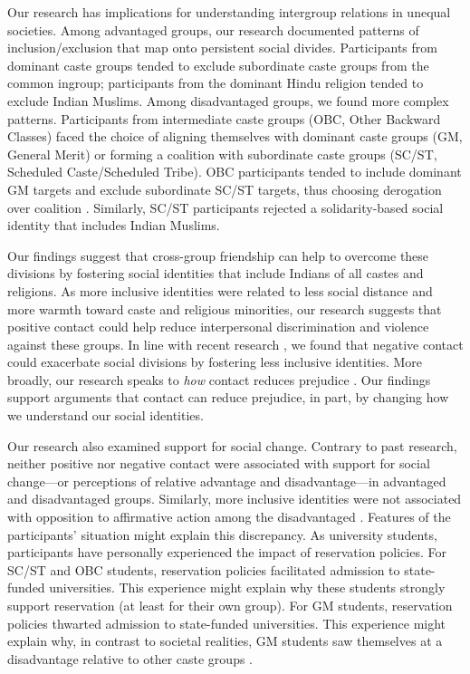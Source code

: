 \documentclass[12pt, a4paper]{article}
\begin{document}
Our research has implications for understanding intergroup relations in unequal societies. Among advantaged groups, our research documented patterns of inclusion/exclusion that map onto persistent social divides. Participants from dominant caste groups tended to exclude subordinate caste groups from the common ingroup; participants from the dominant Hindu religion tended to exclude Indian Muslims. Among disadvantaged groups, we found more complex patterns. Participants from intermediate caste groups (OBC, Other Backward Classes) faced the choice of aligning themselves with dominant caste groups (GM, General Merit) or forming a coalition with subordinate caste groups (SC/ST, Scheduled Caste/Scheduled Tribe). OBC participants tended to include dominant GM targets and exclude subordinate SC/ST targets, thus choosing derogation over coalition \parencite{craig_coalition_2012}. Similarly, SC/ST participants rejected a solidarity-based social identity that includes Indian Muslims.

Our findings suggest that cross-group friendship can help to overcome these divisions by fostering social identities that include Indians of all castes and religions. As more inclusive identities were related to less social distance and more warmth toward caste and religious minorities, our research suggests that positive contact could help reduce interpersonal discrimination and violence against these groups. In line with recent research \parencite{hayward_toward_2017}, we found that negative contact could exacerbate social divisions by fostering less inclusive identities. More broadly, our research speaks to \emph{how} contact reduces prejudice \parencite{pettigrew_how_2008}. Our findings support arguments \parencite{gaertner_reducing_2000, pettigrew_intergroup_1998} that contact can reduce prejudice, in part, by changing how we understand our social identities.

Our research also examined support for social change. Contrary to past research, neither positive nor negative contact \parencite{hayward_how_2018, reimer_intergroup_2017} were associated with support for social change---or perceptions of relative advantage and disadvantage---in advantaged \parencite{selvanathan_whites_2018, dixon_intergroup_2007} and disadvantaged \parencite{dixon_beyond_2012} groups. Similarly, more inclusive identities were not associated with opposition to affirmative action among the disadvantaged \parencite{dixon_attitudes_2012}. Features of the participants’ situation might explain this discrepancy. As university students, participants have personally experienced the impact of reservation policies. For SC/ST and OBC students, reservation policies facilitated admission to state-funded universities. This experience might explain why these students strongly support reservation (at least for their own group). For GM students, reservation policies thwarted admission to state-funded universities. This experience might explain why, in contrast to societal realities, GM students saw themselves at a disadvantage relative to other caste groups \parencite[see][]{norton_whites_2011}.
\end{document}
